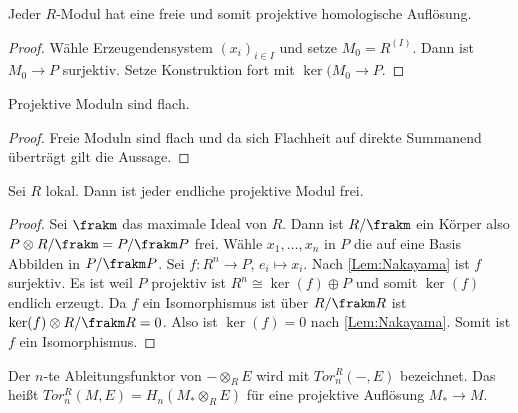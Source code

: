\begin{Satz} Jeder \(R\)-Modul hat eine freie und somit projektive homologische Auflösung.
	
	
\end{Satz}
\begin{proof}
	Wähle Erzeugendensystem \((x_i)_{i\in I}\) und setze \(M_0=R^{(I)}\). 
	Dann ist \(M_0\to P\) surjektiv. Setze Konstruktion fort mit \(\ker(M_0\to P\).
\end{proof}
\begin{Lemma}
	Projektive Moduln sind flach.
\end{Lemma}
\begin{proof}
	Freie Moduln sind flach und da sich Flachheit auf direkte Summanend überträgt gilt die Aussage.
\end{proof}
\begin{Satz} Sei \(R\) lokal. Dann ist jeder endliche projektive Modul frei.
	
\end{Satz}
\begin{proof}
	Sei \(\frakm\) das maximale Ideal von \(R\). Dann ist 
	\(R/\frakm\) ein Körper also \(P\otimes R/\frakm=P/\frakm P\) frei.
	Wähle \(x_1,\dots,x_n\) in \(P\) die auf eine Basis Abbilden in \(P/\frakm P\).
	Sei \(f\colon R^n\to P,\, e_i\mapsto x_i\). Nach \cref{Lem:Nakayama} ist \(f\) surjektiv.
	Es ist weil \(P\) projektiv ist \(R^n\cong \ker(f)\oplus P\) und somit \(\ker(f)\) endlich erzeugt.
	Da \(f\) ein Isomorphismus ist über \(R/\frakm R\) ist \(\ker(f)\otimes R/\frakm R=0\). Also ist \(\ker(f)=0\) nach \cref{Lem:Nakayama}.
	Somit ist \(f\) ein Isomorphismus.
\end{proof}
\begin{Def} Der \(n\)-te Ableitungsfunktor von \(-\otimes_R E\) wird mit \(Tor_n^R(-,E)\) bezeichnet.
	Das heißt \(Tor_n^R(M,E)=H_n(M_*\otimes_R E)\) für eine projektive Auflösung \(M_*\to M\).
	
\end{Def}
